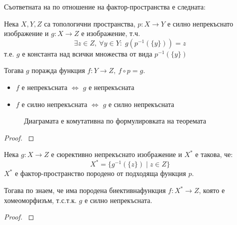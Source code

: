 Съответната на  по отношение на фактор-пространства е следната:
\begin{theorem}\label{th:factor-continuous}
    Нека $X, Y, Z$ са топологични пространства, $p: X \to Y$ е силно непрекъснато изображение и $g: X \to Z$ е изображение, т.ч.
    \begin{equation}
        \exists z \in Z,\ \forall y \in Y:\; g(p^{-1}(\{y\})) = z
    \end{equation}
    т.е. $g$ е константа над всички множества от вида $p^{-1}(\{y\})$

    Тогава $g$ поражда функция $f: Y \to Z,\ f \circ p = g$.
    \begin{itemize}
        \item $f$ е непрекъсната $\iff$ $g$ е непрекъсната
        \item $f$ е силно непрекъсната $\iff$ $g$ е силно непрекъсната
    \end{itemize}

    \begin{figure}[H]
        \centering
        \caption{Диаграмата е комутативна по формулировката на теоремата}
    \end{figure}
\end{theorem}
\begin{proof}
    \cite[стр.~142]{munkrestopology}
\end{proof}
\begin{corollary}
    Нека $g: X \to Z$ е сюрективно непрекъснато изображение и $X^*$ е такова, че:
    \begin{equation}
        X^* = \{g^{-1}(\{z\}) \mid z \in Z\}
    \end{equation}
    $X^*$ е фактор-пространство породено от подходяща функция $p$.

    Тогава по  знаем, че има породена биективна\footnotemark  функция $f: X^* \to Z$, която е хомеоморфизъм, т.с.т.к. $g$ е силно непрекъсната.  
\end{corollary}
\begin{proof}
    \cite[стр.~142-143]{munkrestopology}
\end{proof}

